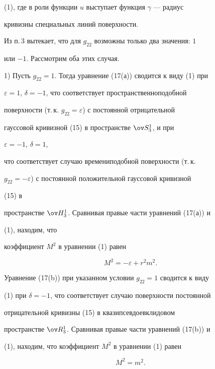(1), где в роли функции $u$ выступает функция $\gamma$ --- радиус


кривизны специальных линий поверхности. 


Из п.\,3 вытекает, что для $g_{22}$ возможны только два значения: $1$


или $-1$. Рассмотрим оба этих случая. 





1) Пусть $g_{22}=1$. Тогда уравнение (17(а)) сводится к виду (1) при


$\varepsilon=1$, $\delta=-1$, что соответствует пространственноподобной


поверхности (т.\,к. $g_{22}=\varepsilon$) с постоянной отрицательной


гауссовой кривизной (15) в пространстве $\ov S^1_3$, и при 


$\varepsilon=-1$, $\delta=1$,


что соответствует случаю времениподобной поверхности (т.\,к.


$g_{22}=-\varepsilon$) с постоянной положительной гауссовой кривизной 


(15) в


пространстве $\ov H^1_3$. Сравнивая правые части уравнений (17(а)) и


(1), находим, что


коэффициент $M^2$ в уравнении (1) равен


\begin{equation}


M^2=-\varepsilon+r^2m^2.


\end{equation}





Уравнение (17(b)) при указанном условии $g_{22}=1$ сводится к виду


(1) при $\delta=-1$, что соответствует случаю поверхности постоянной


отрицательной кривизны (15) в квазипсевдоевклидовом


пространстве $\ov R^1_3$. Сравнивая правые части уравнений (17(b)) и


(1), находим, что коэффициент $M^2$ в уравнении (1) равен


\begin{equation}


M^2=m^2.


\end{equation}





